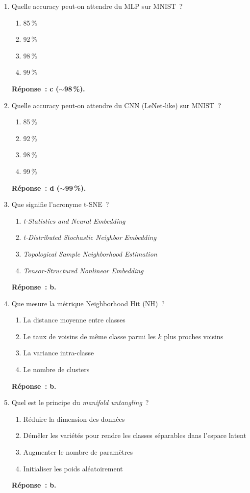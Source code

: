 \documentclass[a4paper,11pt]{article}
\theoremstyle{definition}
\theoremstyle{remark}
\begin{document}
\begin{enumerate}
  \item Quelle accuracy peut-on attendre du MLP sur MNIST~?
    \begin{enumerate}
      \item 85\,\%
      \item 92\,\%
      \item 98\,\%
      \item 99\,\%
    \end{enumerate}
    \textbf{R\'eponse~: c ($\sim$98\,\%).}

  \item Quelle accuracy peut-on attendre du CNN (LeNet-like)
    sur MNIST~?
    \begin{enumerate}
      \item 85\,\%
      \item 92\,\%
      \item 98\,\%
      \item 99\,\%
    \end{enumerate}
    \textbf{R\'eponse~: d ($\sim$99\,\%).}

  \item Que signifie l'acronyme t-SNE~?
    \begin{enumerate}
      \item \emph{t-Statistics and Neural Embedding}
      \item \emph{t-Distributed Stochastic Neighbor Embedding}
      \item \emph{Topological Sample Neighborhood Estimation}
      \item \emph{Tensor-Structured Nonlinear Embedding}
    \end{enumerate}
    \textbf{R\'eponse~: b.}

  \item Que mesure la m\'etrique Neighborhood Hit (NH)~?
    \begin{enumerate}
      \item La distance moyenne entre classes
      \item Le taux de voisins de m\^{e}me classe parmi les $k$ plus
        proches voisins
      \item La variance intra-classe
      \item Le nombre de clusters
    \end{enumerate}
    \textbf{R\'eponse~: b.}

  \item Quel est le principe du \emph{manifold untangling}~?
    \begin{enumerate}
      \item R\'eduire la dimension des donn\'ees
      \item D\'em\^{e}ler les vari\'et\'es pour rendre les classes
        s\'eparables dans l'espace latent
      \item Augmenter le nombre de param\`etres
      \item Initialiser les poids al\'eatoirement
    \end{enumerate}
    \textbf{R\'eponse~: b.}


\end{enumerate}
\end{document}
